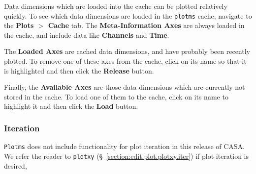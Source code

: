 Data dimensions which are loaded into the cache can be plotted relatively quickly. To see which data dimensions are loaded in the {\tt plotms} cache, navigate to the {\bf Plots $>$ Cache} tab. The {\bf Meta-Information Axes} are always loaded in the cache, and include data like {\bf Channels} and {\bf Time}. 

The {\bf Loaded Axes} are cached data dimensions, and have probably been recently plotted. To remove one of these axes from the cache, click on its name so that it is highlighted and then click the {\bf Release} button.

Finally, the {\bf Available Axes} are those data dimensions which are currently not stored in the cache. To load one of them to the cache, click on its name to highlight it and then click the {\bf Load} button.









\subsubsection{Iteration}
\label{section:edit.plot.plotms.iter}

{\tt Plotms} does not include functionality for plot iteration in this release of CASA. We refer the reader to {\tt plotxy} (\S~\ref{section:edit.plot.plotxy.iter}) if  plot iteration is desired, 

